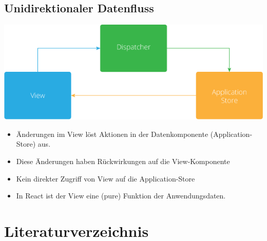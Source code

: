 \documentclass[a4paper]{article}
\newcommand{\printbibliography}[1][h]{}
\begin{document}
\subsection*{Unidirektionaler Datenfluss}
\label{sec:org3e38e09}
\begin{center}
\includegraphics[width=.9\linewidth]{./Abbildungen/unidirectional.png}
\end{center}
\begin{itemize}
\item Änderungen im View löst Aktionen in der Datenkomponente (Application-Store) aus.
\item Diese Änderungen haben Rückwirkungen auf die View-Komponente
\item Kein direkter Zugriff von View auf die Application-Store
\item In React ist der View eine (pure) Funktion der Anwendungsdaten.
\end{itemize}

\section*{Literaturverzeichnis}
\label{sec:org34aa2dc}
\begingroup
\renewcommand{\section}[2]{}%
\printbibliography
\endgroup
\end{document}
